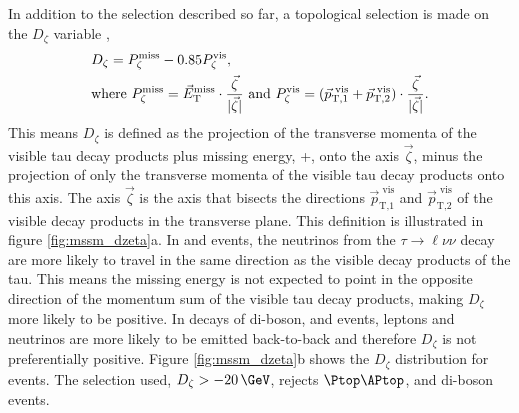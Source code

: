 In addition to the selection described so far,
 a topological selection is made on the $D_{\zeta}$ variable \cite{cdf-dzeta},
\begin{align}\label{eqn:mssm_em_dzeta}
&D_{\zeta} = P_{\zeta}^{\text{miss}} - 0.85 P_{\zeta}^{\text{vis}}, \notag \\
&\text{where } P_{\zeta}^{\text{miss}} = \vec{E}_{\text{T}}^{\text{miss}}\cdot\frac{\vec{\zeta}}{|\vec{\zeta}|} 
\text{ and } P_{\zeta}^{\text{vis}} = (\vec{p}_{\text{T},1}^{\text{  vis}}+\vec{p}_{\text{T},2}^{\text{  vis}})\cdot\frac{\vec{\zeta}}{|\vec{\zeta}|}.
\end{align}
This means $D_{\zeta}$ is defined as the projection of the transverse momenta of the visible tau decay products plus missing energy, \pT+\MET, onto 
the axis $\vec{\zeta}$, minus the projection of only the transverse momenta of the visible tau decay products onto this axis.
The axis $\vec{\zeta}$ is the axis that bisects
the directions $\vec{p}_{\text{T,1}}^{\text{  vis}}$ and $\vec{p}_{\text{T,2}}^{\text{  vis}}$
of the visible decay products in the transverse plane. This definition is illustrated in figure
\ref{fig:mssm_dzeta}a. In \Ztautau and \AHtotautau events, the neutrinos from the $\tau\rightarrow\ell\nu\nu$ decay 
are more likely to travel in the same direction as the visible decay products of the tau. This means the missing
energy is not expected to point in the opposite direction of the momentum sum of 
the visible tau decay products, making $D_{\zeta}$ more likely to be positive. In decays of
di-boson, \ttbar and \Wjets events, leptons and neutrinos are more likely to be emitted back-to-back
and therefore $D_{\zeta}$ is not preferentially positive.
Figure \ref{fig:mssm_dzeta}b shows the $D_{\zeta}$ distribution
for \emu events. The selection used, $D_{\zeta} > -20\,\GeV$, rejects $\ttbar$, \Wjets and di-boson
events. 



